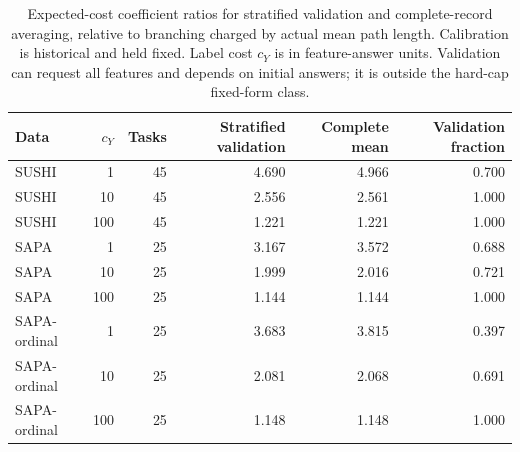\begin{table}[t]
\centering
\caption{Expected-cost coefficient ratios for stratified validation and complete-record averaging, relative to branching charged by actual mean path length. Calibration is historical and held fixed. Label cost $c_Y$ is in feature-answer units. Validation can request all features and depends on initial answers; it is outside the hard-cap fixed-form class.}
\label{tab:validation}
\small
\setlength{\tabcolsep}{4pt}
\begin{tabular}{lrrrrr}
\toprule
Data & $c_Y$ & Tasks & Stratified validation & Complete mean & Validation fraction \\
\midrule
SUSHI & 1 & 45 & 4.690 & 4.966 & 0.700 \\
SUSHI & 10 & 45 & 2.556 & 2.561 & 1.000 \\
SUSHI & 100 & 45 & 1.221 & 1.221 & 1.000 \\
SAPA & 1 & 25 & 3.167 & 3.572 & 0.688 \\
SAPA & 10 & 25 & 1.999 & 2.016 & 0.721 \\
SAPA & 100 & 25 & 1.144 & 1.144 & 1.000 \\
SAPA-ordinal & 1 & 25 & 3.683 & 3.815 & 0.397 \\
SAPA-ordinal & 10 & 25 & 2.081 & 2.068 & 0.691 \\
SAPA-ordinal & 100 & 25 & 1.148 & 1.148 & 1.000 \\
\bottomrule
\end{tabular}
\end{table}
